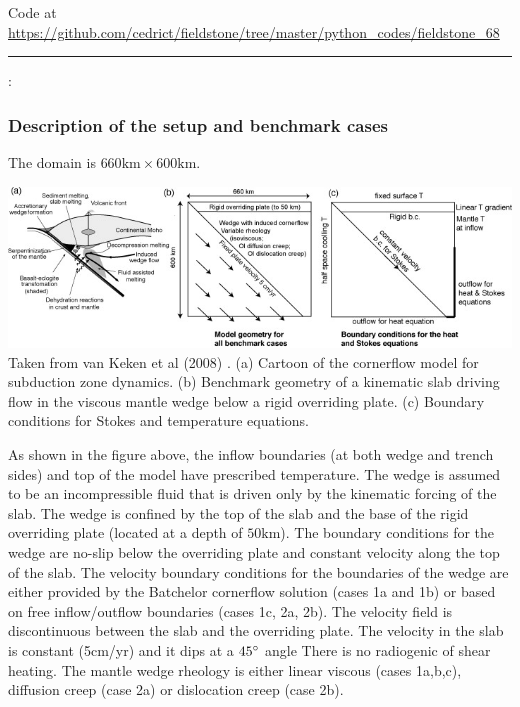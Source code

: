 

\begin{center}
Code at \url{https://github.com/cedrict/fieldstone/tree/master/python_codes/fieldstone_68}
\end{center}

\par\noindent\rule{\textwidth}{0.4pt}



\Literature: \cite{vack08}\cite{syva10}\cite{vakn12}

\subsubsection*{Description of the setup and benchmark cases}


The domain is $660\text{km}\times 600\text{km}$. 

\begin{center}
\includegraphics[width=14cm]{python_codes/fieldstone_68/images/fig1}\\
{\captionfont Taken from van Keken et al (2008) \cite{vack08}.
(a) Cartoon of the cornerflow model for subduction zone dynamics. 
(b) Benchmark geometry of a kinematic slab driving flow in the viscous
mantle wedge below a rigid overriding plate. 
(c) Boundary conditions for Stokes and temperature equations.}
\end{center}

As shown in the figure above, 
the inflow boundaries (at both wedge and trench sides) and top of the model 
have prescribed temperature. The wedge is assumed to be an incompressible fluid that
is driven only by the kinematic forcing of the slab. The wedge is
confined by the top of the slab and the base of the rigid overriding
plate (located at a depth of $50\text{km}$). 
The boundary conditions for the wedge are no-slip below the overriding plate and constant velocity
along the top of the slab. The velocity boundary conditions for the
boundaries of the wedge are either provided by the Batchelor cornerflow 
solution (cases 1a and 1b) or based on free inflow/outflow
boundaries (cases 1c, 2a, 2b). The velocity field is discontinuous between the slab
and the overriding plate.
The velocity in the slab is constant (5cm/yr) and it dips at a $45\degree$ angle
There is no radiogenic of shear heating.
The mantle wedge rheology is either linear viscous (cases 1a,b,c),
diffusion creep (case 2a) or dislocation creep (case 2b).





